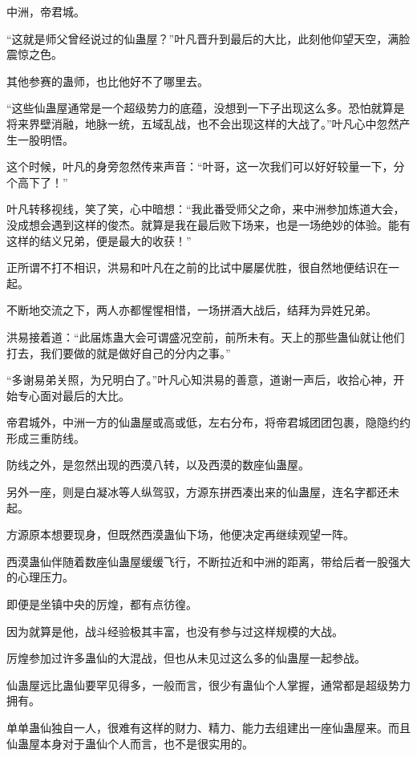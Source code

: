 
\begin{this_body}



中洲，帝君城。

“这就是师父曾经说过的仙蛊屋？”叶凡晋升到最后的大比，此刻他仰望天空，满脸震惊之色。

其他参赛的蛊师，也比他好不了哪里去。

“这些仙蛊屋通常是一个超级势力的底蕴，没想到一下子出现这么多。恐怕就算是将来界壁消融，地脉一统，五域乱战，也不会出现这样的大战了。”叶凡心中忽然产生一股明悟。

这个时候，叶凡的身旁忽然传来声音：“叶哥，这一次我们可以好好较量一下，分个高下了！”

叶凡转移视线，笑了笑，心中暗想：“我此番受师父之命，来中洲参加炼道大会，没成想会遇到这样的俊杰。就算是我在最后败下场来，也是一场绝妙的体验。能有这样的结义兄弟，便是最大的收获！”

正所谓不打不相识，洪易和叶凡在之前的比试中屡屡优胜，很自然地便结识在一起。

不断地交流之下，两人亦都惺惺相惜，一场拼酒大战后，结拜为异姓兄弟。

洪易接着道：“此届炼蛊大会可谓盛况空前，前所未有。天上的那些蛊仙就让他们打去，我们要做的就是做好自己的分内之事。”

“多谢易弟关照，为兄明白了。”叶凡心知洪易的善意，道谢一声后，收拾心神，开始专心面对最后的大比。

帝君城外，中洲一方的仙蛊屋或高或低，左右分布，将帝君城团团包裹，隐隐约约形成三重防线。

防线之外，是忽然出现的西漠八转，以及西漠的数座仙蛊屋。

另外一座，则是白凝冰等人纵驾驭，方源东拼西凑出来的仙蛊屋，连名字都还未起。

方源原本想要现身，但既然西漠蛊仙下场，他便决定再继续观望一阵。

西漠蛊仙伴随着数座仙蛊屋缓缓飞行，不断拉近和中洲的距离，带给后者一股强大的心理压力。

即便是坐镇中央的厉煌，都有点彷徨。

因为就算是他，战斗经验极其丰富，也没有参与过这样规模的大战。

厉煌参加过许多蛊仙的大混战，但也从未见过这么多的仙蛊屋一起参战。

仙蛊屋远比蛊仙要罕见得多，一般而言，很少有蛊仙个人掌握，通常都是超级势力拥有。

单单蛊仙独自一人，很难有这样的财力、精力、能力去组建出一座仙蛊屋来。而且仙蛊屋本身对于蛊仙个人而言，也不是很实用的。


\end{this_body}

